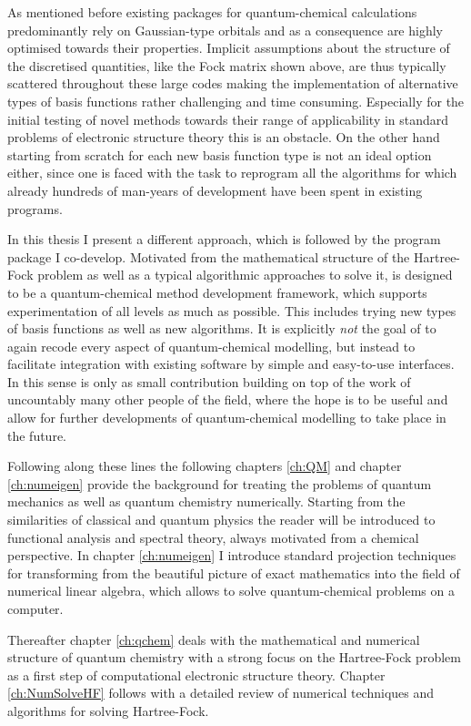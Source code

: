 As mentioned before existing packages for quantum-chemical calculations
predominantly rely on Gaussian-type orbitals
and as a consequence are highly optimised towards their properties.
Implicit assumptions
about the structure of the discretised quantities,
like the Fock matrix shown above,
are thus typically scattered throughout these large codes
making the implementation of alternative types of basis functions
rather challenging and time consuming.
Especially for the initial testing of novel methods
towards their range of applicability
in standard problems of electronic structure theory
this is an obstacle.
On the other hand starting from scratch for each new basis function type
is not an ideal option either,
since one is faced with the task to reprogram all the algorithms for which
already hundreds of man-years of development have been spent in existing programs.

In this thesis I present a different approach,
which is followed by the \molsturm program package I co-develop.
Motivated from the mathematical structure of the Hartree-Fock problem
as well as a typical algorithmic approaches to solve it,
\molsturm is designed to be a quantum-chemical method development framework,
which supports experimentation of all levels as much as possible.
This includes trying new types of basis functions as well as new algorithms.
It is explicitly \emph{not} the goal of \molsturm to again recode
every aspect of quantum-chemical modelling,
but instead to facilitate integration with existing software
by simple and easy-to-use interfaces.
In this sense \molsturm is only as small contribution building on top
of the work of uncountably many other people of the field,
where the hope is to be useful and allow for
further developments of quantum-chemical modelling to take place in the future.

Following along these lines the following chapters
\ref{ch:QM} and chapter \ref{ch:numeigen}
provide the background for treating the problems of quantum mechanics
as well as quantum chemistry numerically.
Starting from the similarities of classical and quantum physics
the reader will be introduced to functional analysis
and spectral theory, always motivated from a chemical perspective.
In chapter \ref{ch:numeigen} I introduce standard projection techniques
for transforming from the beautiful picture of exact mathematics
into the field of numerical linear algebra,
which allows to solve quantum-chemical problems on a computer.

Thereafter chapter \ref{ch:qchem}
deals with the mathematical and numerical structure of quantum chemistry
with a strong focus on the Hartree-Fock problem
as a first step of computational electronic structure theory.
Chapter \ref{ch:NumSolveHF}
follows with a detailed review of numerical techniques and algorithms
for solving Hartree-Fock.

